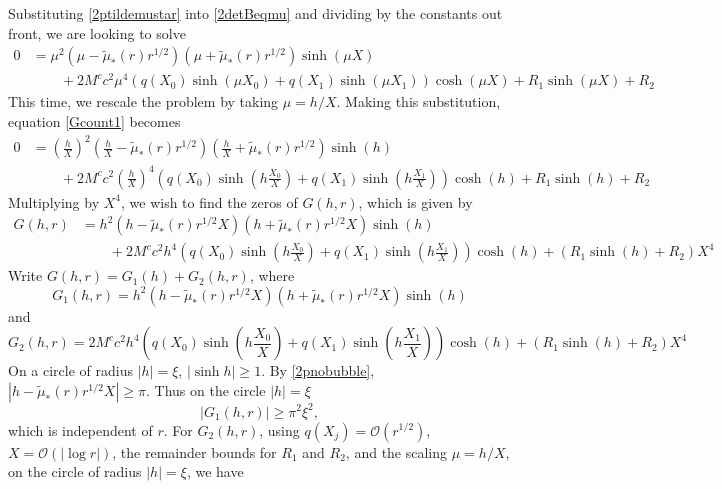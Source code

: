 \documentclass[thesis.tex]{subfiles}
\begin{document}
Substituting \cref{2ptildemustar} into \cref{2detBeqmu} and dividing by the constants out front, we are looking to solve
\begin{equation}\label{Gcount1}
\begin{aligned}
0 &= \mu^2 (\mu - \tilde{\mu}_*(r)r^{1/2}) (\mu + \tilde{\mu}_*(r)r^{1/2}) \sinh(\mu X) \\
&\qquad +2 M^c c^2 \mu^4 ( q(X_0) \sinh(\mu X_0) + q(X_1) \sinh(\mu X_1) ) \cosh(\mu X) + R_1\sinh(\mu X) + R_2
\end{aligned}
\end{equation}
This time, we rescale the problem by taking $\mu = h/X$. Making this substitution, equation \cref{Gcount1} becomes
\begin{equation}\label{Gcount2}
\begin{aligned}
0 &= \left(\frac{h}{X}\right)^2 \left( \frac{h}{X} - \tilde{\mu}_*(r)r^{1/2}\right)\left(\frac{h}{X} + \tilde{\mu}_*(r)r^{1/2}\right) \sinh(h) \\
&\qquad +2 M^c c^2 \left(\frac{h}{X}\right)^4 \left( q(X_0) \sinh\left(h \frac{X_0}{X} \right) + q(X_1) \sinh\left(h \frac{X_1}{X} \right) \right) \cosh(h) + R_1\sinh(h) + R_2
\end{aligned}
\end{equation}
Multiplying by $X^4$, we wish to find the zeros of $G(h, r)$, which is given by
\begin{equation}\label{Gcount3}
\begin{aligned}
G(h,r) &= h^2 \left( h - \tilde{\mu}_*(r)r^{1/2}X\right)\left(h + \tilde{\mu}_*(r)r^{1/2}X\right) \sinh(h) \\
&\qquad +2 M^c c^2 h^4 \left( q(X_0) \sinh\left(h \frac{X_0}{X} \right) + q(X_1) \sinh\left(h \frac{X_1}{X} \right) \right) \cosh(h) + (R_1\sinh(h) + R_2)X^4
\end{aligned}
\end{equation}
Write $G(h,r) = G_1(h) + G_2(h,r)$, where
\[
G_1(h, r) = h^2 \left( h - \tilde{\mu}_*(r)r^{1/2}X\right)\left(h + \tilde{\mu}_*(r)r^{1/2}X\right) \sinh(h)
\]
and
\[
G_2(h,r) = 2 M^c c^2 h^4 \left( q(X_0) \sinh\left(h \frac{X_0}{X} \right) + q(X_1) \sinh\left(h \frac{X_1}{X} \right) \right) \cosh(h) + (R_1\sinh(h) + R_2)X^4
\]
On a circle of radius $|h| = \xi$, $|\sinh h| \geq 1$. By \cref{2pnobubble}, $|h - \tilde{\mu}_*(r)r^{1/2}X|\geq \pi$. Thus on the circle $|h| = \xi$
\[
|G_1(h,r)| \geq \pi^2 \xi^2,
\]
which is independent of $r$. For $G_2(h,r)$, using $q(X_j) = \mathcal{O}(r^{1/2})$, $X = \mathcal{O}(|\log r|)$, the remainder bounds for $R_1$ and $R_2$, and the scaling $\mu = h/X$, on the circle of radius $|h| = \xi$, we have
\end{document}
